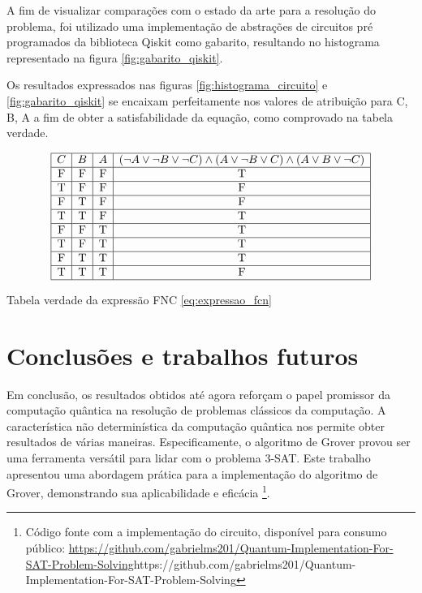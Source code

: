 \documentclass[12pt]{article}
\begin{document}
A fim de visualizar comparações com o estado da arte para a resolução do problema, foi utilizado uma implementação de abstrações de circuitos pré programados da biblioteca Qiskit como gabarito, resultando no histograma representado na figura \ref{fig:gabarito_qiskit}.

Os resultados expressados nas figuras  \ref{fig:histograma_circuito} e \ref{fig:gabarito_qiskit} se encaixam perfeitamente nos valores de atribuição para C, B, A a fim de obter a satisfabilidade da equação, como comprovado na tabela verdade.
\begin{table}[h!]
\centering
\[
\begin{array}{|c|c|c|c|}
\hline
C & B & A & (\neg A \lor \neg B \lor \neg C) \land (A \lor \neg B \lor C) \land (A \lor B \lor \neg C) \\
\hline
\text{F} & \text{F} & \text{F} & \text{T} \\
\hline
\text{T} & \text{F} & \text{F} & \text{F} \\
\hline
\text{F} & \text{T} & \text{F} & \text{F} \\
\hline
\text{T} & \text{T} & \text{F} & \text{T} \\
\hline
\text{F} & \text{F} & \text{T} & \text{T} \\
\hline
\text{T} & \text{F} & \text{T} & \text{T} \\
\hline
\text{F} & \text{T} & \text{T} & \text{T} \\
\hline
\text{T} & \text{T} & \text{T} & \text{F} \\
\hline
\end{array}
\]
\caption{Tabela verdade da expressão FNC \ref{eq:expressao_fcn}}
\label{tab:tabela_verdade}
\end{table}

\section{Conclusões e trabalhos futuros}

Em conclusão, os resultados obtidos até agora reforçam o papel promissor da computação quântica na resolução de problemas clássicos da computação. A característica não determinística da computação quântica nos permite obter resultados de várias maneiras. Especificamente, o algoritmo de Grover provou ser uma ferramenta versátil para lidar com o problema 3-SAT. Este trabalho apresentou uma abordagem prática para a implementação do algoritmo de Grover, demonstrando sua aplicabilidade e eficácia
\footnote{Código fonte com a implementação do circuito, disponível para consumo público:
\url{https://github.com/gabrielms201/Quantum-Implementation-For-SAT-Problem-Solving}{https://github.com/gabrielms201/Quantum-Implementation-For-SAT-Problem-Solving}}.



\end{document}
